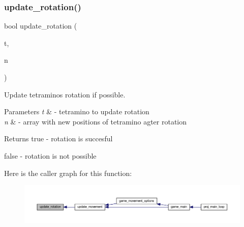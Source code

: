 \subsubsection{\texorpdfstring{update\+\_\+rotation()}{update\_rotation()}}
{\footnotesize\ttfamily bool update\+\_\+rotation (\begin{DoxyParamCaption}\item[{\mbox{\hyperlink{struct_tetramino}{Tetramino}} $\ast$}]{t,  }\item[{uint16\+\_\+t $\ast$}]{n }\end{DoxyParamCaption})}



Update tetramino\textquotesingle{}s rotation if possible. 


\begin{DoxyParams}{Parameters}
{\em t} & -\/ tetramino to update rotation \\
\hline
{\em n} & -\/ array with new positions of tetramino agter rotation \\
\hline
\end{DoxyParams}
\begin{DoxyReturn}{Returns}
true -\/ rotation is succesful 

false -\/ rotation is not possible 
\end{DoxyReturn}
Here is the caller graph for this function\+:
\nopagebreak
\begin{figure}[H]
\begin{center}
\leavevmode
\includegraphics[width=350pt]{group__update__mov_ga8721950ab9fce53424e645c9ba3e8e5a_icgraph}
\end{center}
\end{figure}
